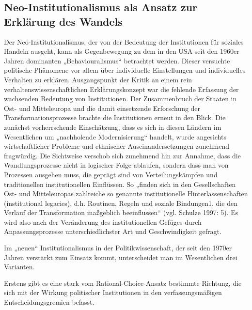 \subsection{Neo-Institutionalismus als Ansatz zur Erklärung des Wandels}
Der Neo-Institutionalismus, der von der Bedeutung der Institutionen für soziales Handeln ausgeht, kann als Gegenbewegung zu dem in den USA seit den 1960er Jahren dominanten „Behaviouralismus“ betrachtet werden. Dieser versuchte politische Phänomene vor allem über individuelle Einstellungen und individuelles Verhalten zu erklären. Ausgangspunkt der Kritik an einem rein verhaltenswissenschaftlichen Erklärungskonzept war die fehlende Erfassung der wachsenden Bedeutung von Institutionen. Der Zusammenbruch der Staaten in Ost- und Mitteleuropa und die damit einsetzende Erforschung der Transformationsprozesse brachte die Institutionen erneut in den Blick. Die zunächst vorherrschende Einschätzung, dass es sich in diesen Ländern im Wesentlichen um „nachholende Modernisierung“ handelt, wurde angesichts wirtschaftlicher Probleme und ethnischer Auseinandersetzungen zunehmend fragwürdig. Die Sichtweise verschob sich zunehmend hin zur Annahme, dass die Wandlungsprozesse nicht in logischer Folge ablaufen, sondern dass man von Prozessen ausgehen muss, die geprägt sind von Verteilungskämpfen und traditionellen institutionellen Einflüssen. So „finden sich in den Gesellschaften Ost- und Mitteleuropas zahlreiche so genannte institutionelle Hinterlassenschaften (institutional legacies), d.h. Routinen, Regeln und soziale Bindungen1, die den Verlauf der Transformation maßgeblich beeinflussen“ (vgl. Schulze 1997: 5). Es wird also nach der Veränderung des institutionellen Gefüges durch Anpassungsprozesse unterschiedlichster Art und Geschwindigkeit gefragt. \par
Im „neuen“ Institutionalismus in der Politikwissenschaft, der seit den 1970er Jahren verstärkt zum Einsatz kommt, unterscheidet man im Wesentlichen drei Varianten.\par
Erstens gibt es eine stark vom Rational-Choice-Ansatz bestimmte Richtung, die sich mit der Wirkung politischer Institutionen in den verfassungsmäßigen Entscheidungsgremien befasst.
